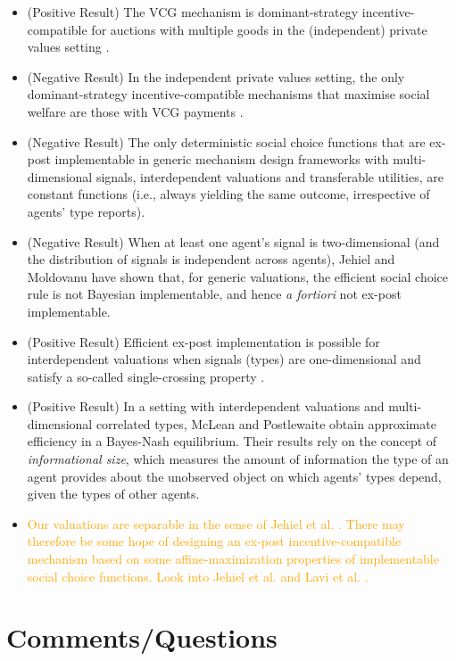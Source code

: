 \documentclass{article}
\begin{document}
\begin{itemize}
\item (Positive Result) The VCG mechanism is dominant-strategy incentive-compatible for auctions with multiple goods in the (independent) private values setting \cite{Vickrey1961,Clarke1971,Groves1973}.
\item (Negative Result) In the independent private values setting, the only dominant-strategy incentive-compatible mechanisms that maximise social welfare are those with VCG payments \cite{GreenLaffont1977}.
\item (Negative Result) The only deterministic social choice functions that are ex-post implementable in generic mechanism design frameworks with multi-dimensional signals, interdependent valuations and transferable utilities, are constant functions \cite{Jehiel2006} (i.e., always yielding the same outcome, irrespective of agents' type reports).
\item (Negative Result) When at least one agent's signal is two-dimensional (and the distribution of signals is independent across agents), Jehiel and Moldovanu \cite{Jehiel2001} have shown that, for generic valuations, the efficient social choice rule is not Bayesian implementable, and hence \textit{a fortiori} not ex-post implementable.
\item (Positive Result) Efficient ex-post implementation is possible for interdependent valuations when signals (types) are one-dimensional and satisfy a so-called single-crossing property \cite{Dasgupta2000}.
\item (Positive Result) In a setting with interdependent valuations and multi-dimensional correlated types, McLean and Postlewaite \cite{McLeanPostlewaite2004} obtain approximate efficiency in a Bayes-Nash equilibrium. Their results rely on the concept of \textit{informational size}, which measures the amount of information the type of an agent provides about the unobserved object on which agents' types depend, given the types of other agents.
\item \textcolor{orange}{Our valuations are separable in the sense of Jehiel et al. \cite{Jehiel2006}. There may therefore be some hope of designing an ex-post incentive-compatible mechanism based on some affine-maximization properties of implementable social choice functions. Look into Jehiel et al. \cite{Jehiel2008} and Lavi et al. \cite{Lavi2003}.}
\end{itemize}


\section{Comments/Questions}
\end{document}
